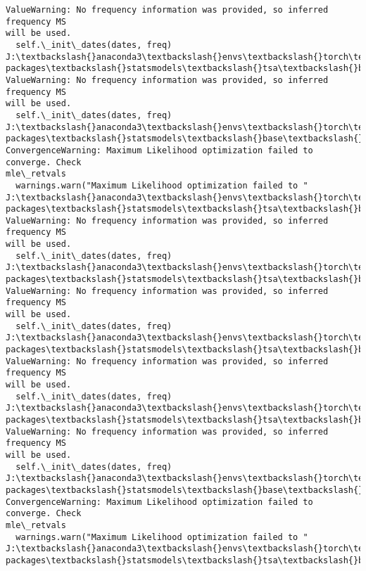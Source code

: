 \documentclass[11pt]{article}
\begin{document}
\begin{Verbatim}[commandchars=\\\{\}]
ValueWarning: No frequency information was provided, so inferred frequency MS
will be used.
  self.\_init\_dates(dates, freq)
J:\textbackslash{}anaconda3\textbackslash{}envs\textbackslash{}torch\textbackslash{}Lib\textbackslash{}site-packages\textbackslash{}statsmodels\textbackslash{}tsa\textbackslash{}base\textbackslash{}tsa\_model.py:473:
ValueWarning: No frequency information was provided, so inferred frequency MS
will be used.
  self.\_init\_dates(dates, freq)
J:\textbackslash{}anaconda3\textbackslash{}envs\textbackslash{}torch\textbackslash{}Lib\textbackslash{}site-packages\textbackslash{}statsmodels\textbackslash{}base\textbackslash{}model.py:607:
ConvergenceWarning: Maximum Likelihood optimization failed to converge. Check
mle\_retvals
  warnings.warn("Maximum Likelihood optimization failed to "
J:\textbackslash{}anaconda3\textbackslash{}envs\textbackslash{}torch\textbackslash{}Lib\textbackslash{}site-packages\textbackslash{}statsmodels\textbackslash{}tsa\textbackslash{}base\textbackslash{}tsa\_model.py:473:
ValueWarning: No frequency information was provided, so inferred frequency MS
will be used.
  self.\_init\_dates(dates, freq)
J:\textbackslash{}anaconda3\textbackslash{}envs\textbackslash{}torch\textbackslash{}Lib\textbackslash{}site-packages\textbackslash{}statsmodels\textbackslash{}tsa\textbackslash{}base\textbackslash{}tsa\_model.py:473:
ValueWarning: No frequency information was provided, so inferred frequency MS
will be used.
  self.\_init\_dates(dates, freq)
J:\textbackslash{}anaconda3\textbackslash{}envs\textbackslash{}torch\textbackslash{}Lib\textbackslash{}site-packages\textbackslash{}statsmodels\textbackslash{}tsa\textbackslash{}base\textbackslash{}tsa\_model.py:473:
ValueWarning: No frequency information was provided, so inferred frequency MS
will be used.
  self.\_init\_dates(dates, freq)
J:\textbackslash{}anaconda3\textbackslash{}envs\textbackslash{}torch\textbackslash{}Lib\textbackslash{}site-packages\textbackslash{}statsmodels\textbackslash{}tsa\textbackslash{}base\textbackslash{}tsa\_model.py:473:
ValueWarning: No frequency information was provided, so inferred frequency MS
will be used.
  self.\_init\_dates(dates, freq)
J:\textbackslash{}anaconda3\textbackslash{}envs\textbackslash{}torch\textbackslash{}Lib\textbackslash{}site-packages\textbackslash{}statsmodels\textbackslash{}base\textbackslash{}model.py:607:
ConvergenceWarning: Maximum Likelihood optimization failed to converge. Check
mle\_retvals
  warnings.warn("Maximum Likelihood optimization failed to "
J:\textbackslash{}anaconda3\textbackslash{}envs\textbackslash{}torch\textbackslash{}Lib\textbackslash{}site-packages\textbackslash{}statsmodels\textbackslash{}tsa\textbackslash{}base\textbackslash{}tsa\_model.py:473:

\end{Verbatim}
\end{document}
